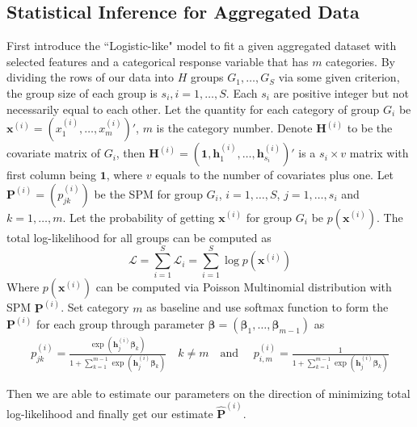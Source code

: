 \documentclass[12pt]{article}
\newcommand{\loglik}{\mathcal{L}}
\newcommand{\Pmat}{\mathbf{P}}
\newcommand{\wh}{\widehat}
\begin{document}
\subsection{Statistical Inference for Aggregated Data}\label{sec:model.est.inf}	
First introduce the ``Logistic-like" model to fit a given aggregated dataset with selected features and a categorical response variable that has $m$ categories.
By dividing the rows of our data into $H$ groups $G_1,\dots,G_{S}$ via some given criterion, the group size of each group is $s_i,i=1,\dots,S$. Each $s_i$ are positive integer but not necessarily equal to each other. Let the quantity for each category of group $G_i$ be $\boldsymbol{x}^{(i)} = (x_1^{(i)}, \dots, x_m^{(i)})'$, $m$ is the category number. Denote $\boldsymbol{H}^{(i)}$ to be the covariate matrix of $G_i$, then $\boldsymbol{H}^{(i)} = (\boldsymbol{1}, \boldsymbol{h}_{1}^{(i)},\dots,\boldsymbol{h}_{s_i}^{(i)})'$ is a $s_i \times v$ matrix with first column being $\boldsymbol{1}$, where $v$ equals to the number of covariates plus one. Let $\Pmat^{(i)} = (p_{jk}^{(i)})$ be the SPM for group $G_i$, $i = 1, \dots, S$, $j = 1,\dots ,s_i$ and $k = 1,\dots, m$. Let the probability of getting $\boldsymbol{x}^{(i)}$ for group $G_i$ be $p(\boldsymbol{x}^{(i)})$. The total log-likelihood for all groups can be computed as
\begin{equation*}
\loglik = \sum_{i=1}^{S}\loglik_i = \sum_{i=1}^{S}\log p(\boldsymbol{x}^{(i)})
\end{equation*}
Where $p(\boldsymbol{x}^{(i)})$ can be computed via Poisson Multinomial distribution with SPM $\Pmat^{(i)}$. Set category $m$ as baseline and use softmax function to form the $\Pmat^{(i)}$ for each group through parameter $\boldsymbol{\beta} = (\boldsymbol{\beta}_1, \dots, \boldsymbol{\beta}_{m-1})$ as
\begin{align*}
    p_{j k}^{(i)} = \frac{\exp{\left(\boldsymbol{h}_{j}^{(i)} \boldsymbol{\beta}_{k}\right)}}{1 + \sum_{k=1}^{m-1}\exp{\left( \boldsymbol{h}_{j}^{(i)} \boldsymbol{\beta}_{k} \right)}}
    \quad k \neq m \quad \text{and } \quad
    p_{i,m}^{(i)} = \frac{1}{1 + \sum_{k=1}^{m-1}\exp{\left( \boldsymbol{h}_{j}^{(i)} \boldsymbol{\beta}_{k} \right)}}
\end{align*}

Then we are able to estimate our parameters on the direction of minimizing total log-likelihood and finally get our estimate $\wh{\Pmat}^{(i)}$. 
\end{document}
